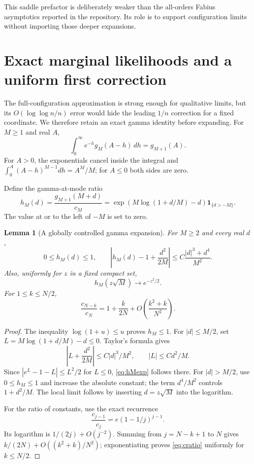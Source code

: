 \documentclass[11pt,letterpaper]{article}
\numberwithin{equation}{section}
\newtheorem{lemma}[theorem]{Lemma}
\theoremstyle{definition}
\theoremstyle{remark}
\newcommand{\ind}{\mathbf 1}
\begin{document}
This saddle prefactor is deliberately weaker than the all-orders Fabius
asymptotics reported in the repository. Its role is to support configuration
limits without importing those deeper expansions.

\section{Exact marginal likelihoods and a uniform first correction}
\label{sec:likelihood}

The full-configuration approximation is strong enough for qualitative limits,
but its $O(\log\log n/n)$ error would hide the leading $1/n$ correction for a
fixed coordinate. We therefore retain an exact gamma identity before expanding.
For $M\ge1$ and real $A$,
\begin{equation}
 \int_0^\infty e^{-h}g_M(A-h)\,dh
 =g_{M+1}(A).
 \label{eq:gammaintegral}
\end{equation}
For $A>0$, the exponentials cancel inside the integral and
$\int_0^A(A-h)^{M-1}dh=A^M/M$; for $A\le0$ both sides are zero.

Define the gamma-at-mode ratio
\begin{equation}
 h_M(d)=\frac{g_{M+1}(M+d)}{c_M}
 =\exp\left(M\log(1+d/M)-d\right)\ind_{\{d>-M\}}.
 \label{eq:hM}
\end{equation}
The value at or to the left of $-M$ is set to zero.

\begin{lemma}[A globally controlled gamma expansion]
\label{lem:gammaexp}
For $M\ge2$ and every real $d$,
\begin{equation}
 0\le h_M(d)\le1,\qquad
 \left|h_M(d)-1+\frac{d^2}{2M}\right|
 \le C\frac{|d|^3+d^4}{M^2}.
 \label{eq:hMexp}
\end{equation}
Also, uniformly for $z$ in a fixed compact set,
\begin{equation}
 h_M(z\sqrt M)\longrightarrow e^{-z^2/2}.
 \label{eq:hMlocal}
\end{equation}
For $1\le k\le N/2$,
\begin{equation}
 \frac{c_{N-k}}{c_N}
 =1+\frac{k}{2N}+O\left(\frac{k^2+k}{N^2}\right).
 \label{eq:cratio}
\end{equation}
\end{lemma}
\begin{proof}
The inequality $\log(1+u)\le u$ proves $h_M\le1$. For $|d|\le M/2$, set
$L=M\log(1+d/M)-d\le0$. Taylor's formula gives
\[
 \left|L+\frac{d^2}{2M}\right|\le C|d|^3/M^2,
 \qquad |L|\le Cd^2/M.
\]
Since $|e^L-1-L|\le L^2/2$ for $L\le0$, \eqref{eq:hMexp} follows there.
For $|d|>M/2$, use $0\le h_M\le1$ and increase the absolute constant;
the term $d^4/M^2$ controls $1+d^2/M$. The local limit follows by inserting
$d=z\sqrt M$ into the logarithm.

For the ratio of constants, use the exact recurrence
\[
 \frac{c_{j-1}}{c_j}=e(1-1/j)^{j-1}.
\]
Its logarithm is $1/(2j)+O(j^{-2})$. Summing from $j=N-k+1$ to $N$ gives
$k/(2N)+O((k^2+k)/N^2)$; exponentiating proves \eqref{eq:cratio} uniformly
for $k\le N/2$.
\end{proof}
\end{document}
